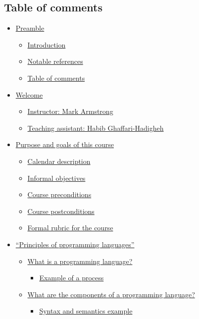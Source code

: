 \documentclass[11pt]{article}
\theoremstyle{definition}
\begin{document}
\subsection{Table of comments}
\label{sec:org3b4fd83}

\begin{scriptsize}
\begin{itemize}
\item \hyperref[sec:org1e3910e]{Preamble}
\begin{itemize}
\item \hyperref[sec:orgb40a370]{Introduction}
\item \hyperref[sec:orgb5a7431]{Notable references}
\item \hyperref[sec:org3b4fd83]{Table of comments}
\end{itemize}
\item \hyperref[sec:org42b4ceb]{Welcome}
\begin{itemize}
\item \hyperref[sec:orgfd0aeed]{Instructor: Mark Armstrong}
\item \hyperref[sec:orgee9af86]{Teaching assistant: Habib Ghaffari-Hadigheh}
\end{itemize}
\item \hyperref[sec:orgbb231f4]{Purpose and goals of this course}
\begin{itemize}
\item \hyperref[sec:org4ca375d]{Calendar description}
\item \hyperref[sec:org1af5ad8]{Informal objectives}
\item \hyperref[sec:org6fd6a6f]{Course preconditions}
\item \hyperref[sec:org2a35ad4]{Course postconditions}
\item \hyperref[sec:orgd950a1b]{Formal rubric for the course}
\end{itemize}
\item \hyperref[sec:org86b4671]{“Principles of programming languages”}
\begin{itemize}
\item \hyperref[sec:org5a26242]{What is a programming language?}
\begin{itemize}
\item \hyperref[sec:orgcaf9edf]{Example of a process}
\end{itemize}
\item \hyperref[sec:orgc8d6318]{What are the components of a programming language?}
\begin{itemize}
\item \hyperref[sec:orge1e9532]{Syntax and semantics example}

\end{itemize}
\end{itemize}
\end{itemize}
\end{scriptsize}
\end{document}
